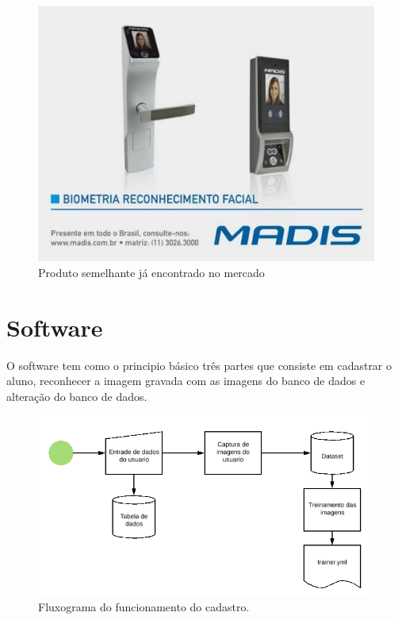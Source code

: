 \documentclass[conference,compsoc]{IEEEtran}
\begin{document}
\begin{figure}[!ht]
		\centering
		\includegraphics[scale=0.25]{exemplo.jpg}
		\caption{Produto semelhante já encontrado no mercado \cite{referencia:8}}
\end{figure}


 \section{Software}

O software tem como o principio básico três partes que consiste em cadastrar o aluno, reconhecer a imagem gravada com as imagens do banco de dados e alteração do banco de dados.

\begin{figure}[!ht]
		\centering
		\includegraphics[scale=0.25]{Cadastro.png}
		\caption{Fluxograma do funcionamento do cadastro.}
\end{figure}
\end{document}
